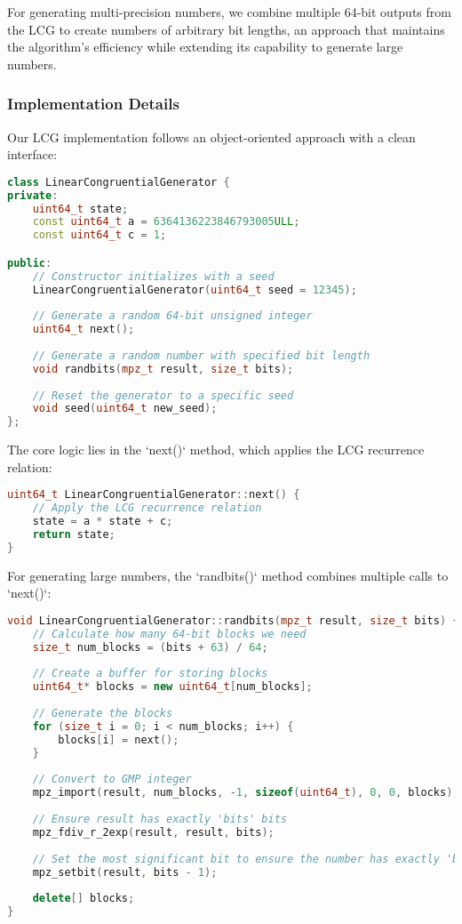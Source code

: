 For generating multi-precision numbers, we combine multiple 64-bit outputs from the LCG to create numbers of arbitrary bit lengths, an approach that maintains the algorithm's efficiency while extending its capability to generate large numbers.

\subsubsection{Implementation Details}

Our LCG implementation follows an object-oriented approach with a clean interface:

\begin{lstlisting}[language=C++, caption=LCG Implementation (Header)]
class LinearCongruentialGenerator {
private:
    uint64_t state;
    const uint64_t a = 6364136223846793005ULL;
    const uint64_t c = 1;

public:
    // Constructor initializes with a seed
    LinearCongruentialGenerator(uint64_t seed = 12345);
    
    // Generate a random 64-bit unsigned integer
    uint64_t next();
    
    // Generate a random number with specified bit length
    void randbits(mpz_t result, size_t bits);
    
    // Reset the generator to a specific seed
    void seed(uint64_t new_seed);
};
\end{lstlisting}

The core logic lies in the `next()` method, which applies the LCG recurrence relation:

\begin{lstlisting}[language=C++, caption=LCG Implementation (Core Function)]
uint64_t LinearCongruentialGenerator::next() {
    // Apply the LCG recurrence relation
    state = a * state + c;
    return state;
}
\end{lstlisting}

For generating large numbers, the `randbits()` method combines multiple calls to `next()`:

\begin{lstlisting}[language=C++, caption=LCG Implementation (Random Bits Generation)]
void LinearCongruentialGenerator::randbits(mpz_t result, size_t bits) {
    // Calculate how many 64-bit blocks we need
    size_t num_blocks = (bits + 63) / 64;
    
    // Create a buffer for storing blocks
    uint64_t* blocks = new uint64_t[num_blocks];
    
    // Generate the blocks
    for (size_t i = 0; i < num_blocks; i++) {
        blocks[i] = next();
    }
    
    // Convert to GMP integer
    mpz_import(result, num_blocks, -1, sizeof(uint64_t), 0, 0, blocks);
    
    // Ensure result has exactly 'bits' bits
    mpz_fdiv_r_2exp(result, result, bits);
    
    // Set the most significant bit to ensure the number has exactly 'bits' bits
    mpz_setbit(result, bits - 1);
    
    delete[] blocks;
}
\end{lstlisting}


